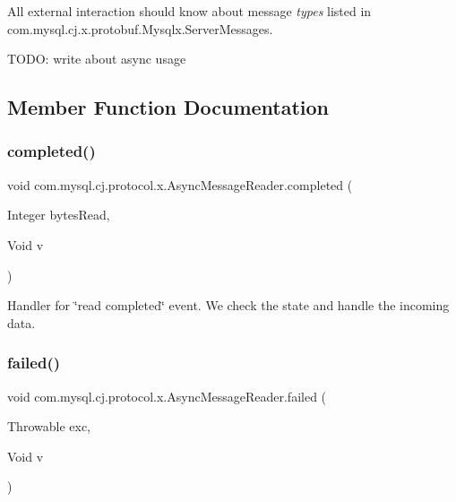 All external interaction should know about message {\itshape types} listed in com.\+mysql.\+cj.\+x.\+protobuf.\+Mysqlx.\+Server\+Messages. 

T\+O\+DO\+: write about async usage 

\subsection{Member Function Documentation}
\mbox{\label{classcom_1_1mysql_1_1cj_1_1protocol_1_1x_1_1_async_message_reader_a24e1c3793c356604d062932c4165b387}} 
\subsubsection{\texorpdfstring{completed()}{completed()}}
{\footnotesize\ttfamily void com.\+mysql.\+cj.\+protocol.\+x.\+Async\+Message\+Reader.\+completed (\begin{DoxyParamCaption}\item[{Integer}]{bytes\+Read,  }\item[{Void}]{v }\end{DoxyParamCaption})}

Handler for \char`\"{}read completed\char`\"{} event. We check the state and handle the incoming data. \mbox{\label{classcom_1_1mysql_1_1cj_1_1protocol_1_1x_1_1_async_message_reader_a32777998d2ffe63d50fcaeaff9774c59}} 
\subsubsection{\texorpdfstring{failed()}{failed()}}
{\footnotesize\ttfamily void com.\+mysql.\+cj.\+protocol.\+x.\+Async\+Message\+Reader.\+failed (\begin{DoxyParamCaption}\item[{Throwable}]{exc,  }\item[{Void}]{v }\end{DoxyParamCaption})}

